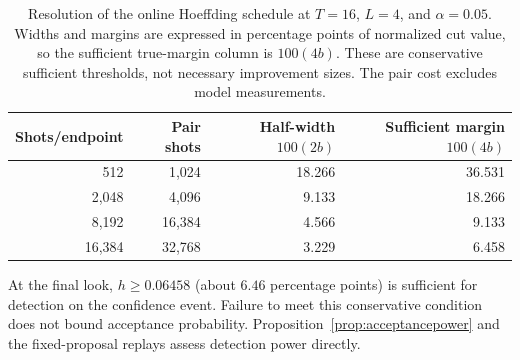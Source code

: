 \documentclass[11pt]{article}
\begin{document}
\begin{table}[!htbp]
\centering\small
\caption{Resolution of the online Hoeffding schedule at $T=16$, $L=4$,
and $\alpha=0.05$. Widths and margins are expressed in percentage points
of normalized cut value, so the sufficient true-margin column is $100(4b)$.
These are conservative sufficient thresholds, not necessary improvement
sizes. The pair cost excludes model measurements.}
\label{tab:resolution}
\begin{tabular}{rrrr}
\toprule
Shots/endpoint & Pair shots & Half-width $100(2b)$ & Sufficient margin $100(4b)$\\
\midrule
512 & 1,024 & 18.266 & 36.531\\
2,048 & 4,096 & 9.133 & 18.266\\
8,192 & 16,384 & 4.566 & 9.133\\
16,384 & 32,768 & 3.229 & 6.458\\
\bottomrule
\end{tabular}
\end{table}
At the final look, $h\ge0.06458$ (about $6.46$ percentage points) is
sufficient for detection on the confidence event. Failure to meet this
conservative condition does not bound acceptance probability.
Proposition~\ref{prop:acceptancepower} and the fixed-proposal replays
assess detection power directly.
\end{document}
